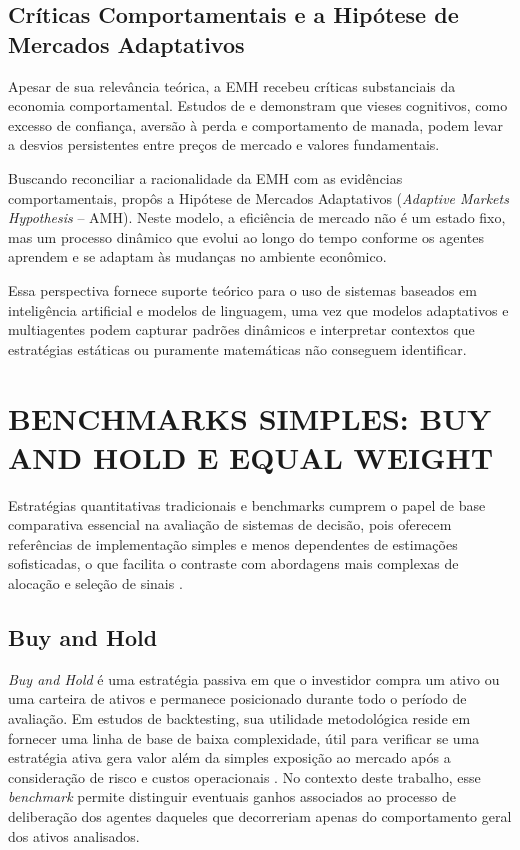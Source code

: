 \documentclass{eic-bcc-tcc}
\begin{document}
\subsection{Críticas Comportamentais e a Hipótese de Mercados Adaptativos}

Apesar de sua relevância teórica, a EMH recebeu críticas substanciais da economia comportamental. Estudos de \citep{Shiller2000} e \citep{Thaler1993} demonstram que vieses cognitivos, como excesso de confiança, aversão à perda e comportamento de manada, podem levar a desvios persistentes entre preços de mercado e valores fundamentais.

Buscando reconciliar a racionalidade da EMH com as evidências comportamentais, \citet{Lo2004} propôs a Hipótese de Mercados Adaptativos (\textit{Adaptive Markets Hypothesis} -- AMH). Neste modelo, a eficiência de mercado não é um estado fixo, mas um processo dinâmico que evolui ao longo do tempo conforme os agentes aprendem e se adaptam às mudanças no ambiente econômico.

Essa perspectiva fornece suporte teórico para o uso de sistemas baseados em inteligência artificial e modelos de linguagem, uma vez que modelos adaptativos e multiagentes podem capturar padrões dinâmicos e interpretar contextos que estratégias estáticas ou puramente matemáticas não conseguem identificar.

\section{BENCHMARKS SIMPLES: BUY AND HOLD E EQUAL WEIGHT}

Estratégias quantitativas tradicionais e benchmarks cumprem o papel de base comparativa essencial na avaliação de sistemas de decisão, pois oferecem referências de implementação simples e menos dependentes de estimações sofisticadas, o que facilita o contraste com abordagens mais complexas de alocação e seleção de sinais \citep{Markowitz1952, Clarke2006, LopezDePrado2018}.

\subsection{Buy and Hold}
\textit{Buy and Hold} é uma estratégia passiva em que o investidor compra um ativo ou uma carteira de ativos e permanece posicionado durante todo o período de avaliação. Em estudos de backtesting, sua utilidade metodológica reside em fornecer uma linha de base de baixa complexidade, útil para verificar se uma estratégia ativa gera valor além da simples exposição ao mercado após a consideração de risco e custos operacionais \citep{LopezDePrado2018, Bailey2014}. No contexto deste trabalho, esse \textit{benchmark} permite distinguir eventuais ganhos associados ao processo de deliberação dos agentes daqueles que decorreriam apenas do comportamento geral dos ativos analisados.
\end{document}
